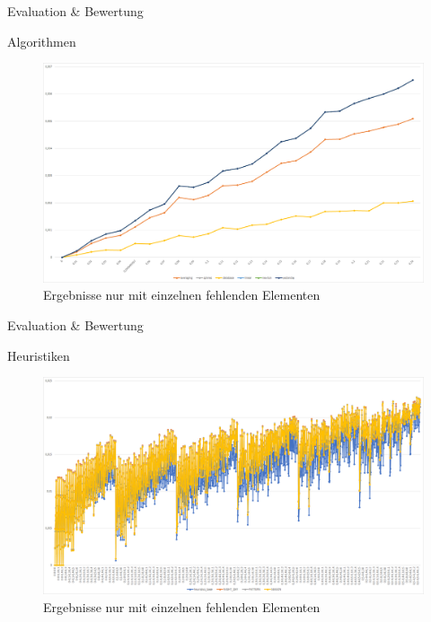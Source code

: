 \begin{frame}{Evaluation \& Bewertung}
\begin{block}{Algorithmen}
\begin{figure}
	\centering
	\includegraphics[width=1\textwidth]{pics/evaluation-algorithms-3.png}
	\caption{Ergebnisse nur mit einzelnen fehlenden Elementen}
\end{figure}
\end{block}
\end{frame}

\begin{frame}{Evaluation \& Bewertung}
\begin{block}{Heuristiken}
\begin{figure}
	\centering
	\includegraphics[width=1\textwidth]{pics/evaluation-heuristics.png}
	\caption{Ergebnisse nur mit einzelnen fehlenden Elementen}
\end{figure}
\end{block}
\end{frame}

